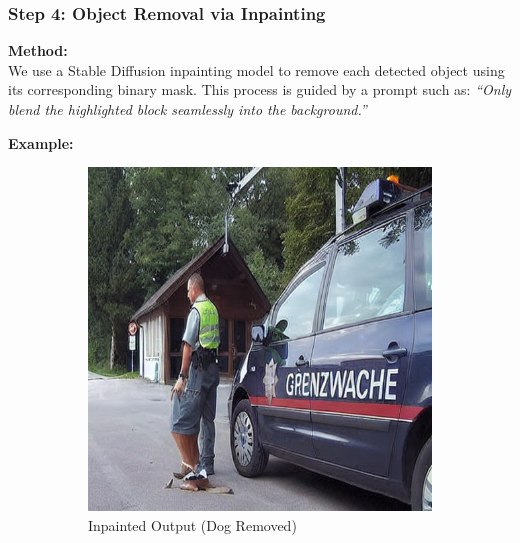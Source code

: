 \documentclass[11pt,letterpaper]{article}
\begin{document}
\subsubsection*{Step 4: Object Removal via Inpainting}

\noindent
\textbf{Method:} \\
We use a Stable Diffusion inpainting model to remove each detected object using its corresponding binary mask. This process is guided by a prompt such as: \emph{``Only blend the highlighted block seamlessly into the background.''}

\noindent
\textbf{Example:}
\begin{figure}[h]
    \centering
    \begin{subfigure}[b]{0.2\textwidth}
        \centering
        \includegraphics[width=\textwidth]{midterm_report/assets/output_dog.png}
        \caption{Inpainted Output (Dog Removed)}
        \label{fig:inpaint_dog}
    \end{subfigure}
    \hfill
    \begin{subfigure}[b]{0.2\textwidth}
        \centering

\end{subfigure}
\end{figure}
\end{document}
